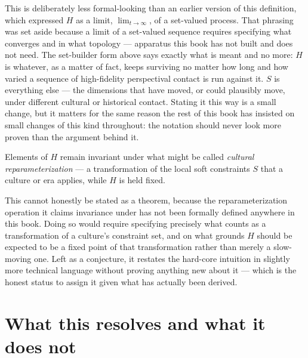 This is deliberately less formal-looking than an earlier version of this definition, which expressed $H$ as a limit, $\lim_{t\to\infty}$, of a set-valued process. That phrasing was set aside because a limit of a set-valued sequence requires specifying what converges and in what topology --- apparatus this book has not built and does not need. The set-builder form above says exactly what is meant and no more: $H$ is whatever, as a matter of fact, keeps surviving no matter how long and how varied a sequence of high-fidelity perspectival contact is run against it. $S$ is everything else --- the dimensions that have moved, or could plausibly move, under different cultural or historical contact. Stating it this way is a small change, but it matters for the same reason the rest of this book has insisted on small changes of this kind throughout: the notation should never look more proven than the argument behind it.

\begin{conjecture}
Elements of $H$ remain invariant under what might be called \emph{cultural reparameterization} --- a transformation of the local soft constraints $S$ that a culture or era applies, while $H$ is held fixed.
\end{conjecture}

This cannot honestly be stated as a theorem, because the reparameterization operation it claims invariance under has not been formally defined anywhere in this book. Doing so would require specifying precisely what counts as a transformation of a culture's constraint set, and on what grounds $H$ should be expected to be a fixed point of that transformation rather than merely a slow-moving one. Left as a conjecture, it restates the hard-core intuition in slightly more technical language without proving anything new about it --- which is the honest status to assign it given what has actually been derived.

\section{What this resolves and what it does not}

